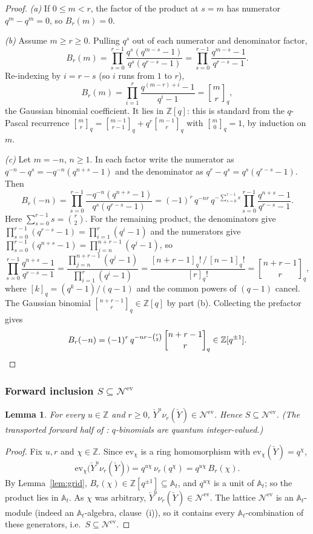 \documentclass[11pt]{article}
\newtheorem{lemma}{Lemma}
\newcommand{\At}{\mathbb{A}_t}
\newcommand{\Nev}{\mathcal N^{\mathrm{ev}}}
\newcommand{\Yc}{\check Y}
\newcommand{\Z}{\mathbb Z}
\newcommand{\ev}{\mathrm{ev}}
\newcommand{\qbinom}[2]{\genfrac{[}{]}{0pt}{}{#1}{#2}_{q}}
\begin{document}
\begin{proof}
\emph{(a)}\; If $0\le m<r$, the factor of the product at $s=m$ has numerator
$q^{m}-q^{m}=0$, so $B_r(m)=0$.

\emph{(b)}\; Assume $m\ge r\ge0$. Pulling $q^{s}$ out of each numerator and
denominator factor,
\[
  B_r(m)=\prod_{s=0}^{r-1}\frac{q^{s}(q^{m-s}-1)}{q^{s}(q^{r-s}-1)}
        =\prod_{s=0}^{r-1}\frac{q^{m-s}-1}{q^{r-s}-1}.
\]
Re-indexing by $i=r-s$ (so $i$ runs from $1$ to $r$),
\[
  B_r(m)=\prod_{i=1}^{r}\frac{q^{(m-r)+i}-1}{q^{i}-1}=\qbinom{m}{r},
\]
the Gaussian binomial coefficient. It lies in $\Z[q]$: this is standard from the
$q$-Pascal recurrence $\qbinom{m}{r}=\qbinom{m-1}{r-1}+q^{r}\qbinom{m-1}{r}$ with
$\qbinom{m}{0}=1$, by induction on $m$.

\emph{(c)}\; Let $m=-n$, $n\ge1$. In each factor write the numerator as
$q^{-n}-q^{s}=-q^{-n}(q^{n+s}-1)$ and the denominator as
$q^{r}-q^{s}=q^{s}(q^{r-s}-1)$. Then
\[
  B_r(-n)=\prod_{s=0}^{r-1}\frac{-q^{-n}(q^{n+s}-1)}{q^{s}(q^{r-s}-1)}
        =(-1)^{r}\,q^{-nr}\,q^{-\sum_{s=0}^{r-1}s}
          \prod_{s=0}^{r-1}\frac{q^{n+s}-1}{q^{r-s}-1}.
\]
Here $\sum_{s=0}^{r-1}s=\binom{r}{2}$. For the remaining product, the
denominators give $\prod_{s=0}^{r-1}(q^{r-s}-1)=\prod_{i=1}^{r}(q^{i}-1)$ and the
numerators give $\prod_{s=0}^{r-1}(q^{n+s}-1)=\prod_{j=n}^{n+r-1}(q^{j}-1)$, so
\[
  \prod_{s=0}^{r-1}\frac{q^{n+s}-1}{q^{r-s}-1}
  =\frac{\prod_{j=n}^{n+r-1}(q^{j}-1)}{\prod_{i=1}^{r}(q^{i}-1)}
  =\frac{[n+r-1]_q!\,/\,[n-1]_q!}{[r]_q!}=\qbinom{n+r-1}{r},
\]
where $[k]_q=(q^{k}-1)/(q-1)$ and the common powers of $(q-1)$ cancel. The
Gaussian binomial $\qbinom{n+r-1}{r}\in\Z[q]$ by part (b). Collecting the
prefactor gives
\[
  B_r(-n)=(-1)^{r}\,q^{-nr-\binom{r}{2}}\,\qbinom{n+r-1}{r}\in\Z[q^{\pm1}].
  \qedhere
\]
\end{proof}

\subsubsection{Forward inclusion $S\subseteq\Nev$}

\begin{lemma}\label{lem:fwd}
For every $u\in\Z$ and $r\ge0$, $\Yc^{u}\nu_r(\Yc)\in\Nev$. Hence $S\subseteq\Nev$.
(The transported forward half of \cite[\S1]{HarmanHopkins}: $q$-binomials are
quantum integer-valued.)
\end{lemma}

\begin{proof}
Fix $u,r$ and $\chi\in\Z$. Since $\ev_\chi$ is a ring homomorphism with
$\ev_\chi(\Yc)=q^{\chi}$,
\[
  \ev_\chi\bigl(\Yc^{u}\nu_r(\Yc)\bigr)=q^{u\chi}\,\nu_r(q^{\chi})
  =q^{u\chi}\,B_r(\chi).
\]
By Lemma~\ref{lem:grid}, $B_r(\chi)\in\Z[q^{\pm1}]\subseteq\At$, and $q^{u\chi}$
is a unit of $\At$; so the product lies in $\At$. As $\chi$ was arbitrary,
$\Yc^{u}\nu_r(\Yc)\in\Nev$. The lattice $\Nev$ is an $\At$-module (indeed an
$\At$-algebra, clause~(i)), so it contains every $\At$-combination of these
generators, i.e.\ $S\subseteq\Nev$.
\end{proof}
\end{document}
